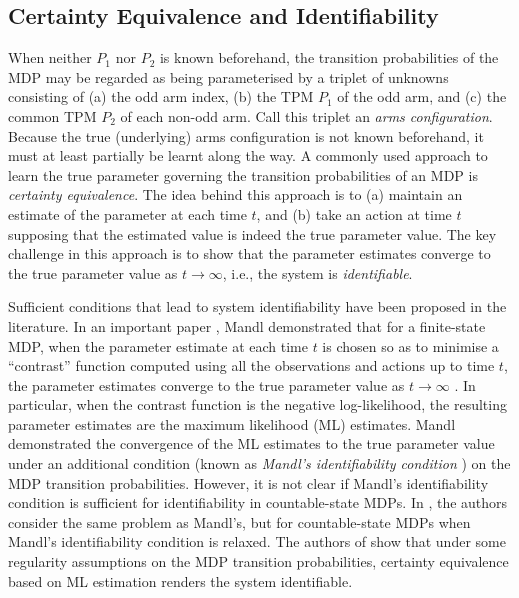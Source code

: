 \subsection{Certainty Equivalence and  Identifiability}
When neither $P_1$ nor $P_2$ is known beforehand, the transition probabilities of the MDP may be regarded as being parameterised by a triplet of unknowns consisting of (a) the odd arm index, (b) the TPM $P_1$ of the odd arm, and (c) the common TPM $P_2$ of each non-odd arm. Call this triplet an {\em arms configuration}. Because the true (underlying) arms configuration is not known beforehand, it must  at least partially be learnt along the way. A commonly used approach to learn the true parameter governing the transition probabilities of an MDP is {\em certainty equivalence}. The idea behind this approach is to (a) maintain an estimate of the parameter at each time $t$, and (b) take an action at time $t$ supposing that the estimated value is indeed the true parameter value. The key challenge in this approach is to show that the parameter estimates converge to the true parameter value as $t\to \infty$, i.e., the system is {\em identifiable}.

Sufficient conditions that lead to system identifiability have been proposed in the literature. In an important paper \cite{mandl1974estimation}, Mandl demonstrated that for a finite-state MDP, when the parameter estimate at each time $t$ is chosen so as to minimise a ``contrast'' function computed using all the observations and actions up to time $t$, the parameter estimates converge to the true parameter  value as $t\to \infty$ \cite[Theorem 6]{mandl1974estimation}. In particular, when the contrast function is the negative log-likelihood, the resulting parameter estimates are the maximum likelihood (ML) estimates. Mandl demonstrated the convergence of the ML estimates to the true parameter value under an additional condition (known as {\em Mandl's identifiability condition} \cite[Eq. (35)]{mandl1974estimation}) on the MDP transition probabilities.  However, it is not clear if Mandl's identifiability condition is sufficient for identifiability in countable-state MDPs. In \cite{borkar1982identification}, the authors consider the same problem as Mandl's, but for countable-state MDPs when Mandl's identifiability condition is relaxed. The authors of \cite{borkar1982identification} show that under some regularity assumptions on the MDP transition probabilities, certainty equivalence based on ML estimation renders the system identifiable.

